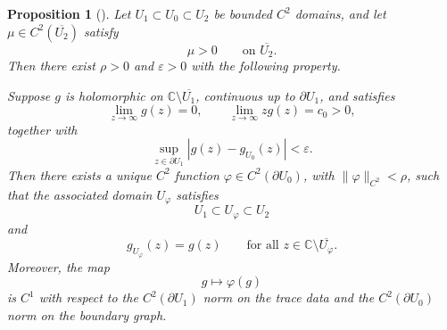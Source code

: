 \documentclass[a4paper,11pt,reqno]{amsart}
\numberwithin{equation}{section}
\theoremstyle{plain} %
\newtheorem{proposition}{Proposition}[section]
\theoremstyle{definition} %
\theoremstyle{remark}
\newcommand{\C}{\mathbb{C}}
\begin{document}
\begin{proposition}[\cite{Cherednichenko}]\label{prop:cherednichenko-tailored}
Let \(U_1\subset U_0\subset U_2\) be bounded \(C^2\) domains, and let
\(\mu\in C^2(\overline{U_2})\) satisfy
\[
\mu>0 \qquad \text{on }\overline{U_2}.
\]
Then there exist \(\rho>0\) and \(\varepsilon>0\) with the following property.

Suppose \(g\) is holomorphic on \(\C\setminus \overline{U_1}\), continuous up to
\(\partial U_1\), and satisfies
\begin{equation}\label{eq:appendix-g-hypotheses}
\lim_{z\to\infty} g(z)=0,
\qquad
\lim_{z\to\infty} zg(z)=c_0>0,
\end{equation}
together with
\[
\sup_{z\in \partial U_1}|g(z)-g_{U_0}(z)|<\varepsilon.
\]
Then there exists a unique \(C^2\) function
\(\varphi\in C^2(\partial U_0)\), with \(\|\varphi\|_{C^2}<\rho\), such that the
associated domain \(U_\varphi\) satisfies
\[
U_1\subset U_\varphi\subset U_2
\]
and
\[
g_{U_\varphi}(z)=g(z)
\qquad \text{for all } z\in \C\setminus \overline{U_\varphi}.
\]
Moreover, the map
\[
g\mapsto \varphi(g)
\]
is \(C^1\) with respect to the \(C^2(\partial U_1)\) norm on the trace data and
the \(C^2(\partial U_0)\) norm on the boundary graph.
\end{proposition}
\end{document}
